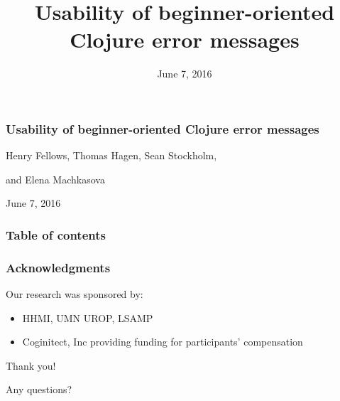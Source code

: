 \documentclass{beamer}
\begin{document}
\title{Usability of beginner-oriented Clojure error messages}
\date{June 7, 2016}

\begin{frame}
\frametitle{Usability of beginner-oriented Clojure error messages}
{\centering
\noindent
Henry Fellows, Thomas Hagen, Sean Stockholm, \par
and Elena Machkasova \par

{\it 
\par
June 7, 2016\par}
}
\end{frame}

\begin{frame}
\frametitle{Table of contents}
\tableofcontents  
\end{frame}

\begin{frame}
\frametitle{Acknowledgments}
	Our research was sponsored by:
	\begin{itemize}
	\item HHMI, UMN UROP, LSAMP
        \item Coginitect, Inc providing funding for participants' compensation 
	\end{itemize}
	{\centering
	\noindent
	Thank you! \par
	Any questions? \par
	}
\end{frame}
\end{document}
